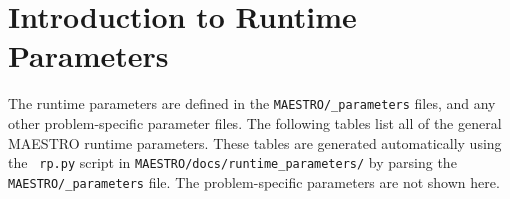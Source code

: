 
\section{Introduction to Runtime Parameters}
\label{sec:runtime_parameters}

The runtime parameters are defined in the {\tt MAESTRO/\_parameters}
files, and any other problem-specific parameter files.
The following tables list all of the general MAESTRO runtime
parameters.  These tables are generated automatically using the {\tt
  rp.py} script in {\tt MAESTRO/docs/runtime\_parameters/} by parsing
the {\tt MAESTRO/\_parameters} file.  The problem-specific parameters
are not shown here.

